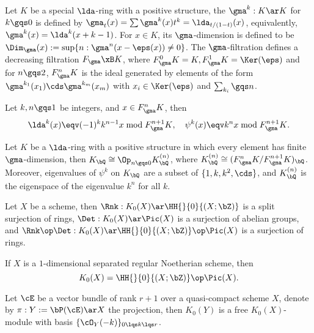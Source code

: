 \documentclass[article, a4paper, twoside]{universal}
\begin{document}
\begin{dfn}
    Let $K$ be a special $\lda$-ring with a positive structure, the  $\gma^{k}:K\ar K$ for $k\gqs0$ is defined by $\gma_{t}(x)=\sum\gma^{k}(x)t^{k}=\lda_{t/(1-t)}(x)$, equivalently, $\gma^{k}(x)=\lda^{k}(x+k-1)$. For $x\in K$, its $\gma$-dimension is defined to be $\Dim_{\gma}(x):=\sup\{n:\gma^{n}(x-\eps(x))\neq0\}$. The $\gma$-filtration defines a decreasing filtration $F_{\gma}\xB K$, where $F_{\gma}^{0}K=K, F_{\gma}^{1}K=\Ker(\eps)$ and for $n\gqs2$, $F_{\gma}^{n}K$ is the ideal generated by elements of the form $\gma^{k_{1}}(x_{1})\cds\gma^{k_{m}}(x_{m})$ with $x_{i}\in\Ker(\eps)$ and $\sum_{k_{i}}\gqs n$.
\end{dfn}

\begin{thm}[\Rnum{2}.4.9]
    Let $k,n\gqs1$ be integers, and $x\in F_{\gma}^{n}K$, then
    \[
        \lda^{k}(x)\eqv(-1)^{k}k^{n-1}x\bmod{F_{\gma}^{n+1}K},\quad \psi^{k}(x)\eqv k^{n}x\bmod{F_{\gma}^{n+1}K}.
    \]
\end{thm}


\begin{thm}[\Rnum{2}.4.10]
    Let $K$ be a $\lda$-ring with a positive structure in which every element has finite $\gma$-dimension, then $K_{\bQ}\cong\Op_{n\gqs0}K_{\bQ}^{(n)}$, where $K_{\bQ}^{(n)}\cong(F_{\gma}^{n}K/F_{\gma}^{n+1}K)_{\bQ}$. Moreover, eigenvalues of $\psi^{k}$ on $K_{\bQ}$ are a subset of $\{1,k,k^{2},\cds\}$, and $K_{\bQ}^{(n)}$ is the eigenspace of the eigenvalue $k^{n}$ for all $k$.
\end{thm}

\begin{thm}[\Rnum{2}.8.1]
    Let $X$ be a scheme, then $\Rnk:K_{0}(X)\ar\HH{}{0}{(X;\bZ)}$ is a split surjection of rings, $\Det:K_{0}(X)\ar\Pic(X)$ is a surjection of abelian groups, and $\Rnk\op\Det:K_{0}(X)\ar\HH{}{0}{(X;\bZ)}\op\Pic(X)$ is a surjection of rings.
\end{thm}

\begin{thm}[\Rnum{2}.8.2.1]
    If $X$ is a $1$-dimensional separated regular Noetherian scheme, then
    \[
        K_{0}(X)=\HH{}{0}{(X;\bZ)}\op\Pic(X).
    \]
\end{thm}

\begin{thm}[\Rnum{2}.8.5]
    Let $\cE$ be a vector bundle of rank $r+1$ over a quasi-compact scheme $X$, denote by $\pi:Y:=\bP(\cE)\ar X$ the projection, then $K_{0}(Y)$ is a free $K_{0}(X)$-module with basis $\{\cO_{Y}(-k)\}_{0\lqs k\lqs r}$.
\end{thm}
\end{document}
